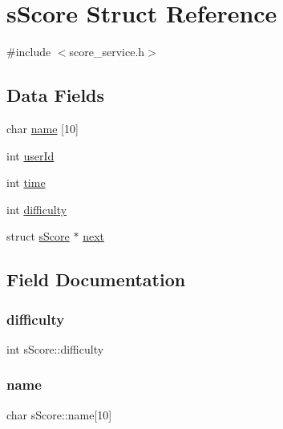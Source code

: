 \hypertarget{structsScore}{}\section{s\+Score Struct Reference}
\label{structsScore}


{\ttfamily \#include $<$score\+\_\+service.\+h$>$}

\subsection*{Data Fields}
\begin{DoxyCompactItemize}
\item 
char \hyperlink{structsScore_ad6c94e9942b0838c3b8c3ce5795a6528}{name} \mbox{[}10\mbox{]}
\item 
int \hyperlink{structsScore_ae792aee1311af8fff27d006ebd86988e}{user\+Id}
\item 
int \hyperlink{structsScore_a30006da4a30926aab57200b3ade48ad3}{time}
\item 
int \hyperlink{structsScore_aeeba9b018cb067a871cb21b25dc115c7}{difficulty}
\item 
struct \hyperlink{structsScore}{s\+Score} $\ast$ \hyperlink{structsScore_a0749a4e6f784bc84f1beb249b61fee2c}{next}
\end{DoxyCompactItemize}


\subsection{Field Documentation}
\mbox{\label{structsScore_aeeba9b018cb067a871cb21b25dc115c7}} 
\subsubsection{\texorpdfstring{difficulty}{difficulty}}
{\footnotesize\ttfamily int s\+Score\+::difficulty}

\mbox{\label{structsScore_ad6c94e9942b0838c3b8c3ce5795a6528}} 
\subsubsection{\texorpdfstring{name}{name}}
{\footnotesize\ttfamily char s\+Score\+::name\mbox{[}10\mbox{]}}

